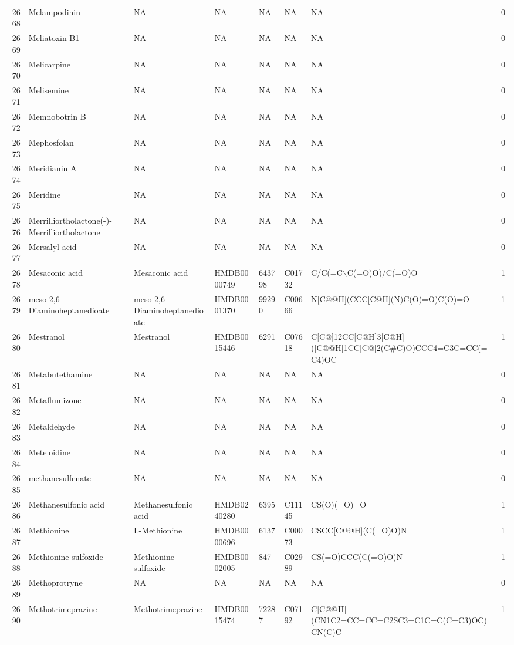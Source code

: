\documentclass[a4paper]{article}
\begin{document}
\begin{longtable}{rlllllll}
  2668 & Melampodinin & NA & NA & NA & NA & NA & 0 \\ 
  2669 & Meliatoxin B1 & NA & NA & NA & NA & NA & 0 \\ 
  2670 & Melicarpine & NA & NA & NA & NA & NA & 0 \\ 
  2671 & Melisemine & NA & NA & NA & NA & NA & 0 \\ 
  2672 & Memnobotrin B & NA & NA & NA & NA & NA & 0 \\ 
  2673 & Mephosfolan & NA & NA & NA & NA & NA & 0 \\ 
  2674 & Meridianin A & NA & NA & NA & NA & NA & 0 \\ 
  2675 & Meridine & NA & NA & NA & NA & NA & 0 \\ 
  2676 & Merrilliortholactone(-)-Merrilliortholactone & NA & NA & NA & NA & NA & 0 \\ 
  2677 & Mersalyl acid & NA & NA & NA & NA & NA & 0 \\ 
  2678 & Mesaconic acid & Mesaconic acid & HMDB0000749 & 643798 & C01732 & C/C(=C$\backslash$C(=O)O)/C(=O)O & 1 \\ 
  2679 & meso-2,6-Diaminoheptanedioate & meso-2,6-Diaminoheptanedioate & HMDB0001370 & 99290 & C00666 & N[C@@H](CCC[C@H](N)C(O)=O)C(O)=O & 1 \\ 
  2680 & Mestranol & Mestranol & HMDB0015446 & 6291 & C07618 & C[C@]12CC[C@H]3[C@H]([C@@H]1CC[C@]2(C\#C)O)CCC4=C3C=CC(=C4)OC & 1 \\ 
  2681 & Metabutethamine & NA & NA & NA & NA & NA & 0 \\ 
  2682 & Metaflumizone & NA & NA & NA & NA & NA & 0 \\ 
  2683 & Metaldehyde & NA & NA & NA & NA & NA & 0 \\ 
  2684 & Meteloidine & NA & NA & NA & NA & NA & 0 \\ 
  2685 & methanesulfenate & NA & NA & NA & NA & NA & 0 \\ 
  2686 & Methanesulfonic acid & Methanesulfonic acid & HMDB0240280 & 6395 & C11145 & CS(O)(=O)=O & 1 \\ 
  2687 & Methionine & L-Methionine & HMDB0000696 & 6137 & C00073 & CSCC[C@@H](C(=O)O)N & 1 \\ 
  2688 & Methionine sulfoxide & Methionine sulfoxide & HMDB0002005 & 847 & C02989 & CS(=O)CCC(C(=O)O)N & 1 \\ 
  2689 & Methoprotryne & NA & NA & NA & NA & NA & 0 \\ 
  2690 & Methotrimeprazine & Methotrimeprazine & HMDB0015474 & 72287 & C07192 & C[C@@H](CN1C2=CC=CC=C2SC3=C1C=C(C=C3)OC)CN(C)C & 1 \\ 

\end{longtable}
\end{document}
